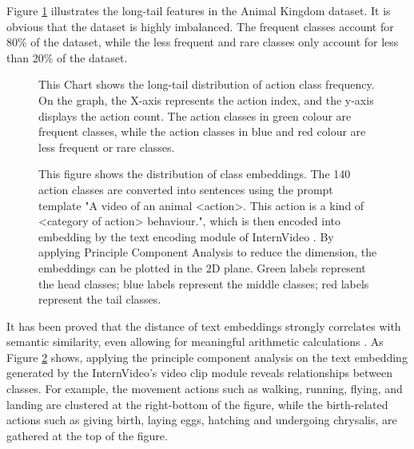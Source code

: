 Figure \ref{fig:1_1_LongTail} illustrates the long-tail features in the Animal Kingdom dataset. It is obvious that the dataset is highly imbalanced. The frequent classes account for 80\% of the dataset, while the less frequent and rare classes only account for less than 20\% of the dataset.

\begin{figure}[ht]
    \centering
    \resizebox{1.0\textwidth}{!}{}
    \caption[Action Classes Frequency Distribution]{This Chart shows the long-tail distribution of action class frequency. On the graph, the X-axis represents the action index, and the y-axis displays the action count. The action classes in green colour are frequent classes, while the action classes in blue and red colour are less frequent or rare classes.}
    \label{fig:1_1_LongTail}
\end{figure}

\begin{figure}[ht]
    \centering
    \caption[Class Embedding Distribution]{This figure shows the distribution of class embeddings. The 140 action classes are converted into sentences using the prompt template "A video of an animal <action>. This action is a kind of <category of action> behaviour.", which is then encoded into embedding by the text encoding module of InternVideo \parencite{wang2022internvideo}. By applying Principle Component Analysis to reduce the dimension, the embeddings can be plotted in the 2D plane. Green labels represent the head classes; blue labels represent the middle classes; red labels represent the tail classes.}
    \label{fig:1_2_ClassEmbeddingInternVideo}
\end{figure}

It has been proved that the distance of text embeddings strongly correlates with semantic similarity, even allowing for meaningful arithmetic calculations \parencite{mikolov2013efficient}. As Figure \ref{fig:1_2_ClassEmbeddingInternVideo} shows, applying the principle component analysis on the text embedding generated by the InternVideo's \parencite{wang2022internvideo} video clip module reveals relationships between classes. For example, the movement actions such as walking, running, flying, and landing are clustered at the right-bottom of the figure, while the birth-related actions such as giving birth, laying eggs, hatching and undergoing chrysalis, are gathered at the top of the figure. 

